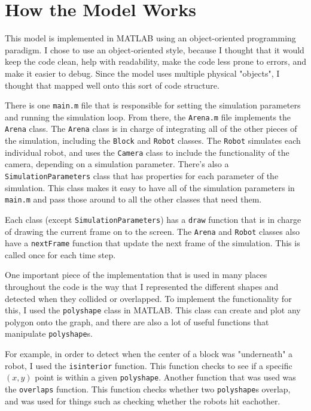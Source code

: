 \documentclass[12pt]{article}
\begin{document}
\section{How the Model Works}
This model is implemented in MATLAB using an object-oriented programming paradigm. I chose to use an object-oriented style, because I thought that it would keep the code clean, help with readability, make the code less prone to errors, and make it easier to debug. Since the model uses multiple physical "objects", I thought that mapped well onto this sort of code structure.

There is one \texttt{main.m} file that is responsible for setting the simulation parameters and running the simulation loop. From there, the \texttt{Arena.m} file implements the \texttt{Arena} class. The \texttt{Arena} class is in charge of integrating all of the other pieces of the simulation, including the \texttt{Block} and \texttt{Robot} classes. The \texttt{Robot} simulates each individual robot, and uses the \texttt{Camera} class to include the functionality of the camera, depending on a simulation parameter. There's also a \texttt{SimulationParameters} class that has properties for each parameter of the simulation. This class makes it easy to have all of the simulation parameters in \texttt{main.m} and pass those around to all the other classes that need them.

Each class (except \texttt{SimulationParameters}) has a \texttt{draw} function that is in charge of drawing the current frame on to the screen. The \texttt{Arena} and \texttt{Robot} classes also have a \texttt{nextFrame} function that update the next frame of the simulation. This is called once for each time step.

One important piece of the implementation that is used in many places throughout the code is the way that I represented the different shapes and detected when they collided or overlapped. To implement the functionality for this, I used the \texttt{polyshape} class in MATLAB. This class can create and plot any polygon onto the graph, and there are also a lot of useful functions that manipulate \texttt{polyshape}s.

For example, in order to detect when the center of a block was "underneath" a robot, I used the \texttt{isinterior} function. This function checks to see if a specific $(x,y)$ point is within a given \texttt{polyshape}. Another function that was used was the \texttt{overlaps} function. This function checks whether two \texttt{polyshape}s overlap, and was used for things such as checking whether the robots hit eachother.
\end{document}
